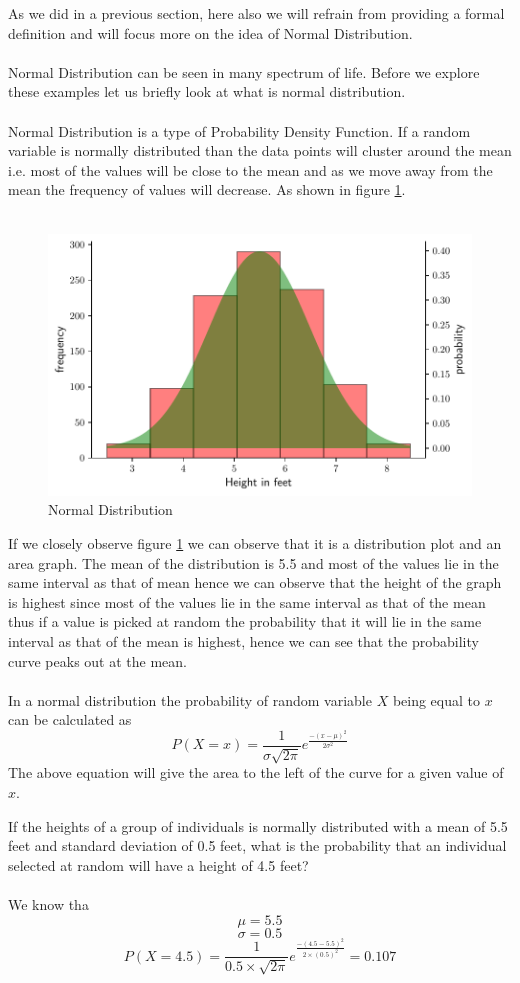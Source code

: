 \documentclass[twoside,12pt]{report}  %
\begin{document}
As we did in a previous section, here also we will refrain from providing a formal definition and will focus more on the idea of Normal Distribution. 
\\
\\
Normal Distribution can be seen in many spectrum of life. Before we explore these examples let us briefly look at what is normal distribution.
\\
\\
Normal Distribution is a type of Probability Density Function. If a random variable is normally distributed than the data points will cluster around the mean i.e. most of the values will be close to the mean and as we move away from the mean the frequency of values will decrease. As shown in figure \ref{figure_normal_example}.
\\
\\
\begin{figure}[H]
	\centering
	\includegraphics[width=0.5\linewidth]{./images/figure_probabilitydensityfunction_example.pdf}
	\caption{Normal Distribution}
	\label{figure_normal_example}
\end{figure}
\noindent
If we closely observe figure \ref{figure_normal_example} we can observe that it is a distribution plot and an area graph. The mean of the distribution is 5.5 and most of the values lie in the same interval as that of mean hence we can observe that the height of the graph is highest since most of the values lie in the same interval as that of the mean thus if a value is picked at random the probability that it will lie in the same interval as that of the mean is highest, hence we can see that the probability curve peaks out at the mean.  
\\
\\
In a normal distribution the probability of random variable $X$ being equal to $x$ can be calculated as
$$ \boxed{P(X = x) = \frac{1}{\sigma \sqrt{2 \pi}}e^{\frac{{-(x - \mu)^2}}{2 {\sigma}^2}} }$$
\noindent
The above equation will give the area to the left of the curve for a given value of $x$.
\\
\begin{tcolorbox}[colback=blue!5!white, colframe=blue!75!black, title = \textbf{Normal Distribution}]
	If the heights of a group of individuals is normally distributed with a mean of 5.5 feet and standard deviation of 0.5 feet, what is the probability that an individual selected at random will have a height of 4.5 feet?
	\\
	\\
	We know tha
	$$ \mu = 5.5 $$
	$$ \sigma = 0.5 $$
	$$ P(X = 4.5) = \frac{1}{0.5 \times \sqrt{2 \pi}} e^{\frac{-(4.5 - 5.5)^2}{2 \times (0.5)^2}}  = 0.107 $$ 
\end{tcolorbox}
\end{document}
